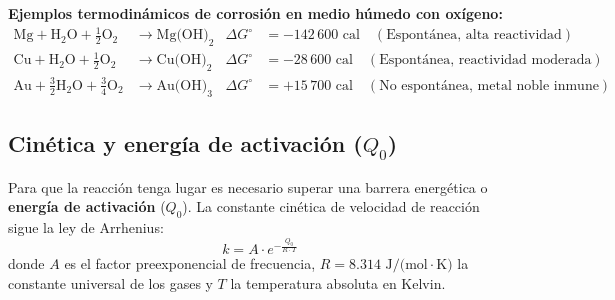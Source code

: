 \textbf{Ejemplos termodinámicos de corrosión en medio húmedo con oxígeno:}
\begin{align}
    \text{Mg} + \text{H}_2\text{O} + \frac{1}{2}\text{O}_2 &\longrightarrow \text{Mg(OH)}_2 & \Delta G^\circ &= -142\,600\text{ cal} \quad (\text{Espontánea, alta reactividad}) \\
    \text{Cu} + \text{H}_2\text{O} + \frac{1}{2}\text{O}_2 &\longrightarrow \text{Cu(OH)}_2 & \Delta G^\circ &= -28\,600\text{ cal} \quad (\text{Espontánea, reactividad moderada}) \\
    \text{Au} + \frac{3}{2}\text{H}_2\text{O} + \frac{3}{4}\text{O}_2 &\longrightarrow \text{Au(OH)}_3 & \Delta G^\circ &= +15\,700\text{ cal} \quad (\text{No espontánea, metal noble inmune})
\end{align}


\subsection{Cinética y energía de activación ($Q_0$)}
Para que la reacción tenga lugar es necesario superar una barrera energética o \textbf{energía de activación} ($Q_0$). La constante cinética de velocidad de reacción sigue la ley de Arrhenius:
\begin{equation}
    k = A \cdot e^{-\frac{Q_0}{R \cdot T}}
    \label{eq:arrhenius}
\end{equation}
donde $A$ es el factor preexponencial de frecuencia, $R = 8.314\text{ J/(mol}\cdot\text{K)}$ la constante universal de los gases y $T$ la temperatura absoluta en Kelvin.

